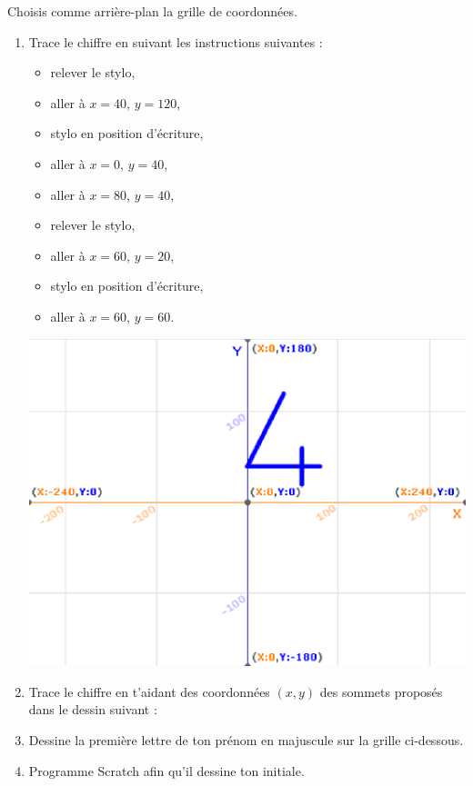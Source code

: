 \documentclass[class=report,crop=false, 12pt]{standalone}
\begin{document}
\begin{activite}

Choisis comme arrière-plan la grille de coordonnées.

\begin{enumerate}
  \item Trace le chiffre \og {} \fg{} en suivant les instructions suivantes :
  \begin{itemize}
    \item relever le stylo,
    \item aller à $x=40$, $y=120$,
    \item stylo en position d'écriture,
    \item aller à $x=0$, $y=40$,
    \item aller à $x=80$, $y=40$,
    \item relever le stylo,
    \item aller à $x=60$, $y=20$,
    \item stylo en position d'écriture,
    \item aller à $x=60$, $y=60$.  
  \end{itemize}
  
\begin{center}
  \includegraphics[scale=\scaleecran,scale=0.7]{ecran-03-ex3}   
\end{center}
  
  \item Trace le chiffre \og {} \fg{} en t'aidant des coordonnées $(x,y)$ des sommets proposés dans le dessin suivant : 
  

  \item Dessine la première lettre de ton prénom en majuscule sur la grille ci-dessous.

  
  \item Programme Scratch afin qu'il dessine ton initiale.
  
  
\end{enumerate}


\end{activite}
\end{document}
